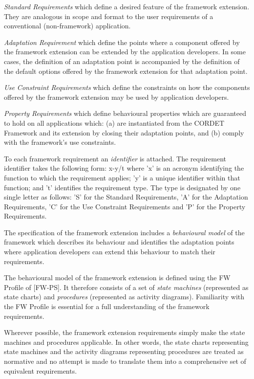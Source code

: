 \documentclass[a4paper,10pt]{article}
\newenvironment{fw_itemize}						%
{\begin{itemize}
  \setlength{\itemsep}{1mm}
  \setlength{\parskip}{0pt}
  \setlength{\parsep}{0pt}}
{\end{itemize}}
\begin{document}
\begin{fw_itemize}
\item{} \textit{Standard Requirements} which define a desired feature of the framework extension. They are analogous in scope and format to the user requirements of a conventional (non-framework) application.
\item{} \textit{Adaptation Requirement} which define the points where a component offered by the framework extension can be extended by the application developers. In some cases, the definition of an adaptation point is accompanied by the definition of the default options offered by the framework extension for that adaptation point.  
\item{} \textit{Use Constraint Requirements} which define the constraints on how the components offered by the framework extension may be used by application developers.
\item{} \textit{Property Requirements} which define behavioural properties which are guaranteed to hold on all applications which: (a) are instantiated from the CORDET Framework and its extension by closing their adaptation points, and (b) comply with the framework's use constraints.
\end{fw_itemize}

To each framework requirement an \textit{identifier} is attached.
The requirement identifier takes the following form: x-y/t where 'x' is an acronym identifying the function to which the requirement applies; 'y' is a unique identifier within that function; and 't' identifies the requirement type. 
The type is designated by one single letter as follows: 'S' for the Standard Requirements, 'A' for the Adaptation Requirements, 'C' for the Use Constraint Requirements and 'P' for the Property Requirements.

The specification of the framework extension includes a \textit{behavioural model} of the framework which describes its behaviour and identifies the adaptation points where application developers can extend this behaviour to match their requirements.  

The behavioural model of the framework extension is defined using the FW Profile of [FW-PS]. It therefore consists of a set of \textit{state machines} (represented as state charts) and \textit{procedures} (represented as  activity diagrams). Familiarity with the FW Profile is essential for a full understanding of the framework requirements.

Wherever possible, the framework extension requirements simply make the state machines and procedures applicable. In other words, the state charts representing state machines and the activity diagrams representing procedures are treated as normative and no attempt is made to translate them into a comprehensive set of equivalent requirements.
\end{document}
